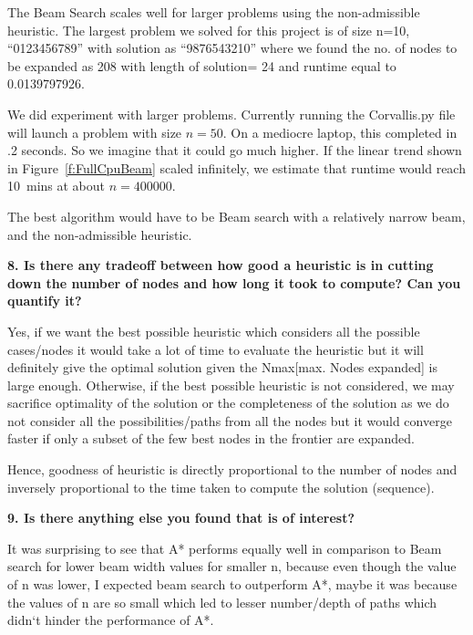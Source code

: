 \documentclass[12pt]{article}
\begin{document}
The Beam Search scales well for larger problems using the non-admissible heuristic. The largest problem we solved for this project is of size n=10, “0123456789” with solution as “9876543210” where we found the no. of nodes to be expanded as 208 with length of solution= 24 and runtime equal to 0.0139797926. 

We did experiment with larger problems. Currently running the Corvallis.py file will launch a problem with size $n=50$. On a mediocre laptop, this completed in .2 seconds.  So we imagine that it could go much higher. 
If the linear trend shown in Figure~\ref{f:FullCpuBeam} scaled infinitely, we estimate that runtime would reach \SI{10}{mins} at about $n=400000$.

The best algorithm would have to be Beam search with a relatively narrow beam, and the non-admissible heuristic.

\textbf{8. Is there any tradeoff between how good a heuristic is in cutting down the number of nodes and how long it took to compute? Can you quantify it?}

Yes, if we want the best possible heuristic which considers all the possible cases/nodes it would take a lot of time to evaluate the heuristic but it will definitely give the optimal solution given the Nmax[max. Nodes expanded] is large enough. Otherwise, if the best possible heuristic is not considered, we may sacrifice optimality of the solution or the completeness of the solution as we do not consider all the possibilities/paths from all the nodes but it would converge faster if only a subset of the few best nodes in the frontier are expanded.

Hence, goodness of heuristic is directly proportional to the number of nodes and inversely proportional to the time taken to compute the solution (sequence).

\textbf{9. Is there anything else you found that is of interest?}

It was surprising to see that A* performs equally well in comparison to Beam search for lower beam width values for smaller n, because even though the value of n was lower, I expected beam search to outperform A*, maybe it was because the values of n are so small which led to lesser number/depth of paths which didn`t hinder the performance of A*.
\end{document}
